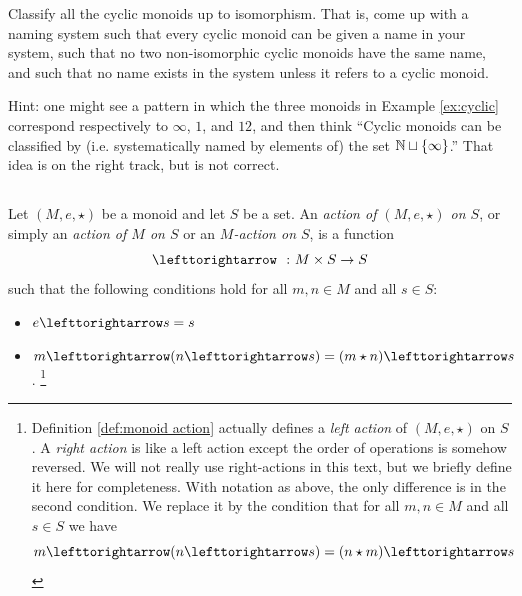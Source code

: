 \begin{exampleRUS}\label{ex:cyclic monoid (7,4)}
\end{exampleRUS}

\begin{exerciseENG}\label{exc:classify cyclic}
Classify all the cyclic monoids up to isomorphism. That is, come up with a naming system such that every cyclic monoid can be given a name in your system, such that no two non-isomorphic cyclic monoids have the same name, and such that no name exists in the system unless it refers to a cyclic monoid. 

Hint: one might see a pattern in which the three monoids in Example \ref{ex:cyclic} correspond respectively to $\infty$, $1$, and $12$, and then think “Cyclic monoids can be classified by (i.e. systematically named by elements of) the set ${\mathbb N}\sqcup\{\infty\}$.” That idea is on the right track, but is not correct.
\end{exerciseENG}

\begin{exerciseRUS}\label{exc:classify cyclic}
\end{exerciseRUS}


\subsection{}

\begin{definitionENG}\label{def:monoid action}
Let $(M,e,\star)$ be a monoid and let $S$ be a set. An {\em action of $(M,e,\star)$ on $S$}, or simply an {\em action of $M$ on $S$} or an {\em $M$-action on $S$}, is a function $$\acts\;\;\taking M\times S\to S$$ such that the following conditions hold for all $m,n\in M$ and all $s\in S$:
\begin{itemize}
\item $e\acts s=s$
\item $m\acts(n\acts s)=(m\star n)\acts s$.
\footnote{
Definition \ref{def:monoid action} actually defines a {\em left action} of $(M,e,\star)$ on $S$. A {\em right action} is like a left action except the order of operations is somehow reversed. We will not really use right-actions in this text, but we briefly define it here for completeness. With notation as above, the only difference is in the second condition. We replace it by the condition that for all $m,n\in M$ and all $s\in S$ we have 
$$m\acts(n\acts s)=(n\star m)\acts s
$$}
\end{itemize}
\end{definitionENG}

